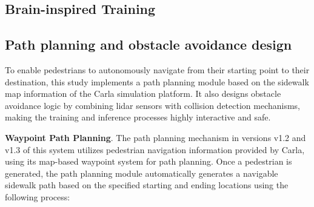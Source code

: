 \documentclass[lettersize,journal]{IEEEtran}
\begin{document}



\subsection{Brain-inspired Training}







\subsection{Path planning and obstacle avoidance design}

To enable pedestrians to autonomously navigate from their starting point to their destination, this study implements a path planning module based on the sidewalk map information of the Carla simulation platform. 
It also designs obstacle avoidance logic by combining lidar sensors with collision detection mechanisms, making the training and inference processes highly interactive and safe.


\textbf{Waypoint Path Planning}.
The path planning mechanism in versions v1.2 and v1.3 of this system utilizes pedestrian navigation information provided by Carla, using its map-based waypoint system for path planning. Once a pedestrian is generated, the path planning module automatically generates a navigable sidewalk path based on the specified starting and ending locations using the following process:
\end{document}
